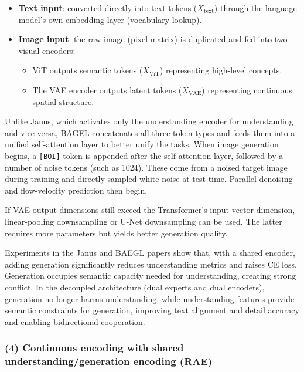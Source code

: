 \begin{itemize}
\tightlist
\item
  \textbf{Text input}: converted directly into text tokens (\(X_{\mathrm{text}}\)) through the language model's own embedding layer (vocabulary lookup).
\item
{}
  \textbf{Image input}: the raw image (pixel matrix) is duplicated and fed into two visual encoders:

  \begin{itemize}
  \tightlist
  \item
    ViT outputs semantic tokens (\(X_{\mathrm{ViT}}\)) representing high-level concepts.
  \item
    The VAE encoder outputs latent tokens (\(X_{\mathrm{VAE}}\)) representing continuous spatial structure.
  \end{itemize}
\end{itemize}

Unlike Janus, which activates only the understanding encoder for understanding and vice versa, BAGEL concatenates all three token types and feeds them into a unified self-attention layer to better unify the tasks. When image generation begins, a \texttt{{[}BOI{]}} token is appended after the self-attention layer, followed by a number of noise tokens (such as 1024). These come from a noised target image during training and directly sampled white noise at test time. Parallel denoising and flow-velocity prediction then begin.

If VAE output dimensions still exceed the Transformer's input-vector dimension, linear-pooling downsampling or U-Net downsampling can be used. The latter requires more parameters but yields better generation quality.

Experiments in the Janus and BAEGL papers show that, with a shared encoder, adding generation significantly reduces understanding metrics and raises CE loss. Generation occupies semantic capacity needed for understanding, creating strong conflict. In the decoupled architecture (dual experts and dual encoders), generation no longer harms understanding, while understanding features provide semantic constraints for generation, improving text alignment and detail accuracy and enabling bidirectional cooperation.

\hypertarget{continuous-encoding-with-shared-understandinggeneration-encoding-rae}{%
\subsubsection{(4) Continuous encoding with shared understanding/generation encoding (RAE)}\label{continuous-encoding-with-shared-understandinggeneration-encoding-rae}}

